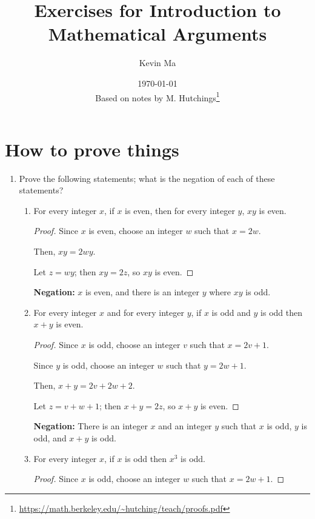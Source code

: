 \documentclass{article}
\title{Exercises for Introduction to Mathematical Arguments}
\author{Kevin Ma}
\date{\today\\\small{Based on notes by M.
Hutchings\footnote{\url{https://math.berkeley.edu/~hutching/teach/proofs.pdf}}}}
\newcommand{\negation}[1]{\textbf{Negation:} #1}
\begin{document}
\maketitle

\setcounter{section}{1}

\section{How to prove things}

\begin{enumerate}
  \item Prove the following statements; what is the negation of each
    of these statements?
    \begin{enumerate}
      \item For every integer $x$, if $x$ is even, then for every
        integer $y$, $xy$ is even.

        \begin{proof}
          Since $x$ is even, choose an integer $w$ such that $x = 2w$.

          Then, $xy = 2wy$.

          Let $z=wy$; then $xy=2z$, so $xy$ is even.
        \end{proof}

        \negation{$x$ is even, and there is an integer $y$ where $xy$ is odd.}

      \item For every integer $x$ and for every integer $y$, if $x$
        is odd and $y$ is odd then $x + y$ is even.

        \begin{proof}
          Since $x$ is odd, choose an integer $v$ such that $x=2v+1$.

          Since $y$ is odd, choose an integer $w$ such that $y=2w+1$.

          Then, $x+y=2v+2w+2$.

          Let $z=v+w+1$; then $x+y=2z$, so $x+y$ is even.
        \end{proof}

        \negation{There is an integer $x$ and an integer $y$ such
        that $x$ is odd, $y$ is odd, and $x+y$ is odd.}

      \item For every integer $x$, if $x$ is odd then $x^3$ is odd.

        \begin{proof}
          Since $x$ is odd, choose an integer $w$ such that $x=2w+1$.


\end{proof}
\end{enumerate}
\end{enumerate}
\end{document}

